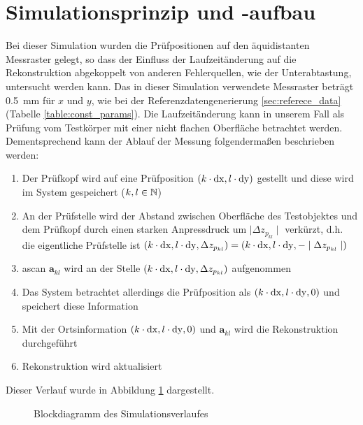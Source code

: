 \section{Simulationsprinzip und -aufbau} \label{sec:zscan_setup}
Bei dieser Simulation wurden die Prüfpositionen auf den äquidistanten Messraster gelegt, so dass der Einfluss der Laufzeitänderung auf die Rekonstruktion abgekoppelt von anderen Fehlerquellen, wie der Unterabtastung, untersucht werden kann. Das in dieser Simulation verwendete Messraster beträgt \SI{0.5}{\milli \metre} für $x$ und $y$, wie bei der Referenzdatengenerierung \ref{sec:referece_data} (Tabelle \ref{table:const_params}). Die Laufzeitänderung kann in unserem Fall als Prüfung vom Testkörper mit einer nicht flachen Oberfläche betrachtet werden. Dementsprechend kann der Ablauf der Messung folgendermaßen beschrieben werden:
\begin{enumerate}
\item Der Prüfkopf wird auf eine Prüfposition $(k \cdot \operatorname{dx}, l \cdot \operatorname{dy})$ gestellt und diese wird im System gespeichert ($k, l \in {\mathbb{N}}$)
\item An der Prüfstelle wird der Abstand zwischen Oberfläche des Testobjektes und dem Prüfkopf durch einen starken Anpressdruck um $ \mid \Delta z_{p_{kl}} \mid$ verkürzt, d.h. die eigentliche Prüfstelle ist $ (k \cdot \operatorname{dx}, l \cdot \operatorname{dy}, \Delta z_{p_{kl}}) = (k \cdot \operatorname{dx}, l \cdot \operatorname{dy}, - \mid \Delta z_{p_{kl}} \mid)$
\item \gls{ascan} $\bm{a}_{kl}$ wird an der Stelle $(k \cdot \operatorname{dx}, l \cdot \operatorname{dy}, \Delta z_{p_{kl}})$ aufgenommen
\item Das System betrachtet allerdings die Prüfposition als $(k \cdot \operatorname{dx}, l \cdot \operatorname{dy}, 0)$ und speichert diese Information 
\item Mit der Ortsinformation $(k \cdot \operatorname{dx}, l \cdot \operatorname{dy}, 0)$ und $\bm{a}_{kl}$ wird die Rekonstruktion durchgeführt
\item Rekonstruktion wird aktualisiert 
\end{enumerate}
Dieser Verlauf wurde in Abbildung \ref{fig:zscan_blockdiagram} dargestellt. \par
\begin{figure}
\begin{center}
\caption{Blockdiagramm des Simulationsverlaufes}
\label{fig:zscan_blockdiagram}
\end{center}
\end{figure}

